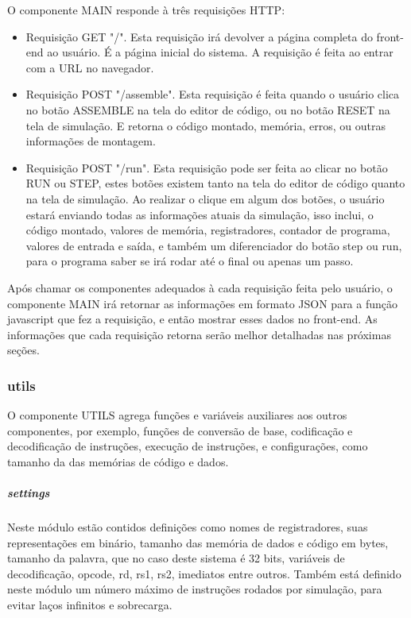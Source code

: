 			O componente MAIN responde à três requisições HTTP:
			\begin{itemize}
				\item Requisição GET "/". Esta requisição irá devolver a página completa do front-end ao usuário. É a página inicial do sistema. A requisição é feita ao entrar com a URL no navegador.
				\item Requisição POST "/assemble". Esta requisição é feita quando o usuário clica no botão ASSEMBLE na tela do editor de código, ou no botão RESET na tela de simulação. E retorna o código montado, memória, erros, ou outras informações de montagem.
				\item Requisição POST "/run". Esta requisição pode ser feita ao clicar no botão RUN ou STEP, estes botões existem tanto na tela do editor de código quanto na tela de simulação. Ao realizar o clique em algum dos botões, o usuário estará enviando todas as informações atuais da simulação, isso inclui, o código montado, valores de memória, registradores, contador de programa, valores de entrada e saída, e também um diferenciador do botão step ou run, para o programa saber se irá rodar até o final ou apenas um passo.
			\end{itemize}

			Após chamar os componentes adequados à cada requisição feita pelo usuário, o componente MAIN irá retornar as informações em formato JSON para a função javascript que fez a requisição, e então mostrar esses dados no front-end. As informações que cada requisição retorna serão melhor detalhadas nas próximas seções.

		\subsubsection{utils}

			O componente UTILS agrega funções e variáveis auxiliares aos outros componentes, por exemplo, funções de conversão de base, codificação e decodificação de instruções, execução de instruções, e configurações, como tamanho da das memórias de código e dados.

				\subparagraph{settings}

					Neste módulo estão contidos definições como nomes de registradores, suas representações em binário, tamanho das memória de dados e código em bytes, tamanho da palavra, que no caso deste sistema é 32 bits, variáveis de decodificação, opcode, rd, rs1, rs2, imediatos entre outros. Também está definido neste módulo um número máximo de instruções rodados por simulação, para evitar laços infinitos e sobrecarga. 

